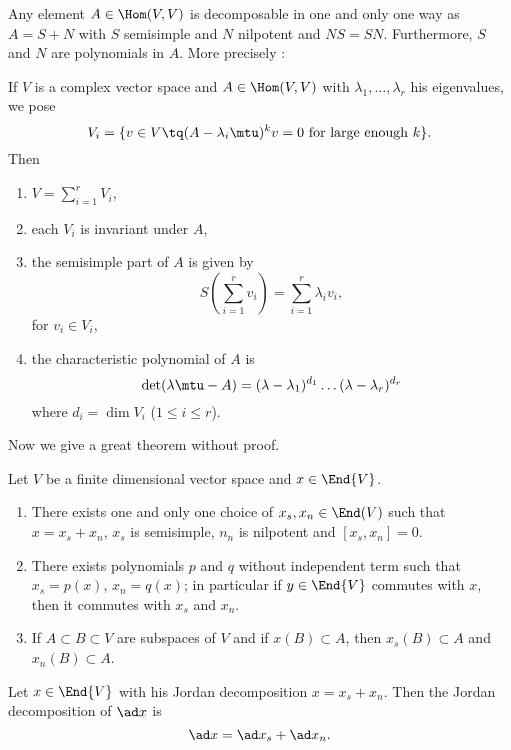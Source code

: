 \begin{theorem}
Any element $A\in\Hom(V,V)$ is decomposable in one and only one way as $A=S+N$ with $S$ semisimple and $N$ nilpotent and $NS=SN$. Furthermore, $S$ and $N$ are polynomials in $A$. More precisely :

If $V$ is a complex vector space and $A\in\Hom(V,V)$ with $\lambda_1,\ldots,\lambda_r$ his eigenvalues, we pose 
\[
V_i=\{ v\in V\tq (A-\lambda_i\mtu)^kv=0 \textrm{ for large enough $k$}\}.
\]
Then

\begin{enumerate}\label{tho:jordan}
\item $V=\sum_{i=1}^rV_i$,
\item each $V_i$ is invariant under $A$,
\item the semisimple part of $A$ is given by
\[
   S(\sum_{i=1}^rv_i)=\sum_{i=1}^r\lambda_iv_i,
\]
for $v_i\in V_i$,

\item the characteristic polynomial of $A$ is
\[
  \det(\lambda\mtu-A)=(\lambda-\lambda_1)^{d_1}\ldots(\lambda-\lambda_r)^{d_r}
\]
where $d_i=\dim V_i$ ($1\leq i\leq r$).
\end{enumerate}
\end{theorem}

Now we give a great theorem without proof.
\begin{theorem}
Let $V$ be a finite dimensional vector space and $x\in\End{V}$. 

\begin{enumerate}
\item There exists one and only one choice of $x_s,x_n\in\End(V)$ such that $x=x_s+x_n$, $x_s$ is semisimple, $n_n$ is nilpotent and $[x_s,x_n]=0$.

\item There exists polynomials $p$ and $q$ without independent term such that $x_s=p(x)$, $x_n=q(x)$; in particular if $y\in\End{V}$ commutes with $x$, then it commutes with $x_s$ and $x_n$.

\item If $A\subset B\subset V$ are subspaces of $V$ and if $x(B)\subset A$, then $x_s(B)\subset A$ and $x_n(B)\subset A$.
\end{enumerate}
\label{prop:Jordan_decomp}
\end{theorem}

\begin{lemma}\label{lem:Jordan_ad}
    Let $x\in\End{V}$ with his Jordan decomposition $x=x_s+x_n$. Then the Jordan decomposition of $\ad x$ is
    \begin{equation}\label{eq:ad_x_xs_xn}
       \ad x=\ad x_s+\ad x_n.
    \end{equation}
\end{lemma}

